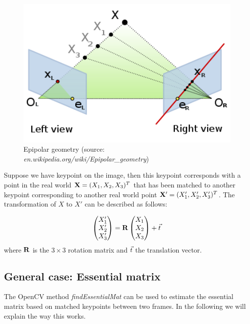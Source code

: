 \begin{figure}
    \centering
    \includegraphics[width=1\textwidth]{figures/epipolar_geometry.png}
    \caption{Epipolar geometry (source: \textit{en.wikipedia.org/wiki/Epipolar\_geometry})}
    \label{fig:epigeo}
\end{figure}

Suppose we have keypoint on the image, then this keypoint corresponds with a point in the real world $\mathbf{X} = (X_1, X_2, X_3)^T$ that has been matched to another keypoint corresponding to another real world point $\mathbf{X}' = (X_1', X_2', X_3')^T$. The transformation of $X$ to $X'$ can be described as follows: 

\begin{equation} \label{eq:1}
    \begin{pmatrix}
        X_1' \\
        X_2' \\
        X_3'
    \end{pmatrix}
    = \mathbf{R}
    \begin{pmatrix}
        X_1 \\
        X_2 \\
        X_3
    \end{pmatrix}
    + \vec t
\end{equation}
where $\mathbf{R}$ is the $3 \times 3$ rotation matrix and $\vec t$ the translation vector.

\subsection{General case: Essential matrix}\label{ssec:essentialmat}
The OpenCV method \textit{findEssentialMat} can be used to estimate the essential matrix based on matched keypoints between two frames. In the following we will explain the way this works.\bigskip

